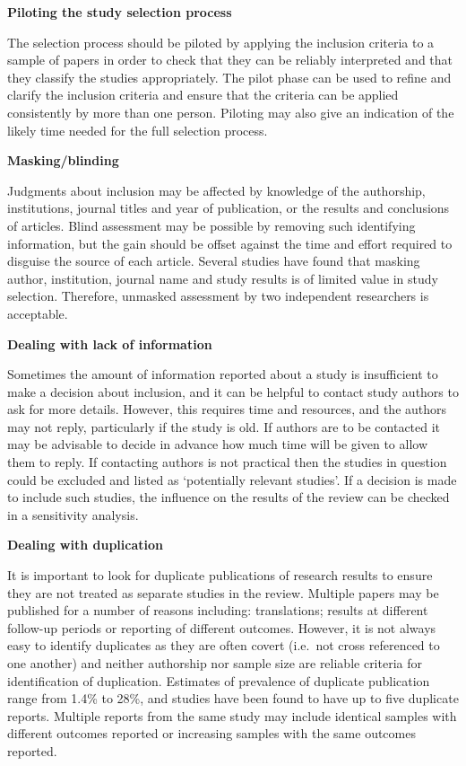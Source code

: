 \documentclass[
  10pt,
  a4paper,
  DIV=11,
  numbers=noendperiod]{scrreprt}
\begin{document}
\textbf{Piloting the study selection process}

The selection process should be piloted by applying the inclusion
criteria to a sample of papers in order to check that they can be
reliably interpreted and that they classify the studies appropriately.
The pilot phase can be used to refine and clarify the inclusion criteria
and ensure that the criteria can be applied consistently by more than
one person. Piloting may also give an indication of the likely time
needed for the full selection process.

\textbf{Masking/blinding}

Judgments about inclusion may be affected by knowledge of the
authorship, institutions, journal titles and year of publication, or the
results and conclusions of articles. Blind assessment may be possible by
removing such identifying information, but the gain should be offset
against the time and effort required to disguise the source of each
article. Several studies have found that masking author, institution,
journal name and study results is of limited value in study selection.
Therefore, unmasked assessment by two independent researchers is
acceptable.

\textbf{Dealing with lack of information}

Sometimes the amount of information reported about a study is
insufficient to make a decision about inclusion, and it can be helpful
to contact study authors to ask for more details. However, this requires
time and resources, and the authors may not reply, particularly if the
study is old. If authors are to be contacted it may be advisable to
decide in advance how much time will be given to allow them to reply. If
contacting authors is not practical then the studies in question could
be excluded and listed as `potentially relevant studies'. If a decision
is made to include such studies, the influence on the results of the
review can be checked in a sensitivity analysis.

\textbf{Dealing with duplication}

It is important to look for duplicate publications of research results
to ensure they are not treated as separate studies in the review.
Multiple papers may be published for a number of reasons including:
translations; results at different follow-up periods or reporting of
different outcomes. However, it is not always easy to identify
duplicates as they are often covert (i.e.~not cross referenced to one
another) and neither authorship nor sample size are reliable criteria
for identification of duplication. Estimates of prevalence of duplicate
publication range from 1.4\% to 28\%, and studies have been found to
have up to five duplicate reports. Multiple reports from the same study
may include identical samples with different outcomes reported or
increasing samples with the same outcomes reported.
\end{document}
